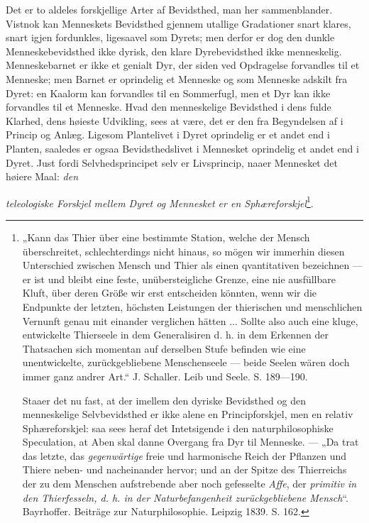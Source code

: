 \documentclass[12pt,a4paper]{book}
\begin{document}
Det er to aldeles forskjellige Arter af Bevidsthed, man her sammenblander.
Vistnok kan Menneskets Bevidsthed gjennem utallige Gradationer snart klares,
snart igjen fordunkles, ligesaavel som Dyrets; men derfor er dog den dunkle
Menneskebevidsthed ikke dyrisk, den klare Dyrebevidsthed ikke menneskelig.
Menneskebarnet er ikke et genialt Dyr, der siden ved Opdragelse forvandles til
et Menneske; men Barnet er oprindelig et Menneske og som Menneske adskilt fra
Dyret: en Kaalorm kan forvandles til en Sommerfugl, men et Dyr kan ikke
forvandles til et Menneske. Hvad den menneskelige Bevidsthed i dens fulde
Klarhed, dens høieste Udvikling, sees at være, det er den fra Begyndelsen af i
Princip og Anlæg. Ligesom Plantelivet i Dyret oprindelig er et andet end i
Planten, saaledes er ogsaa Bevidsthedslivet i Mennesket oprindelig et andet end
i Dyret. Just fordi Selvhedsprincipet selv er Livsprincip, naaer Mennesket det
høiere Maal: \emph{den}

\setcounter{footnote}{0}
\emph{teleologiske Forskjel mellem Dyret og Mennesket er en
Sphæreforskjel}\footnote{„Kann das Thier über eine bestimmte Station, welche der
Mensch überschreitet, schlechterdings nicht hinaus, so mögen wir immerhin diesen
Unterschied zwischen Mensch und Thier als einen qvantitativen bezeichnen --- er
ist und bleibt eine feste, unübersteigliche Grenze, eine nie ausfüllbare Kluft,
über deren Größe wir erst entscheiden könnten, wenn wir die Endpunkte der
letzten, höchsten Leistungen der thierischen und menschlichen Vernunft genau mit
einander verglichen hätten ... Sollte also auch eine kluge, entwickelte
Thierseele in dem Generalisiren d. h. in dem Erkennen der Thatsachen sich
momentan auf derselben Stufe befinden wie eine unentwickelte, zurückgebliebene
Menschenseele --- beide Seelen wären doch immer ganz andrer Art.“ J. Schaller.
Leib und Seele. S. 189---190.

Staaer det nu fast, at der imellem den dyriske Bevidsthed og den menneskelige
Selvbevidsthed er ikke alene en Principforskjel, men en relativ Sphæreforskjel:
saa sees heraf det Intetsigende i den naturphilosophiske Speculation, at Aben
skal danne Overgang fra Dyr til Menneske. --- „Da trat das letzte, das
\emph{gegenwärtige} freie und harmonische Reich der Pflanzen und Thiere neben-
und nacheinander hervor; und an der Spitze des Thierreichs der zu dem Menschen
aufstrebende aber noch gefesselte \emph{Affe}, der \emph{primitiv in den
Thierfesseln, d. h. in der Naturbefangenheit zurückgebliebene Mensch}“.
Bayrhoffer. Beiträge zur Naturphilosophie. Leipzig 1839. S. 162.}.
\end{document}
